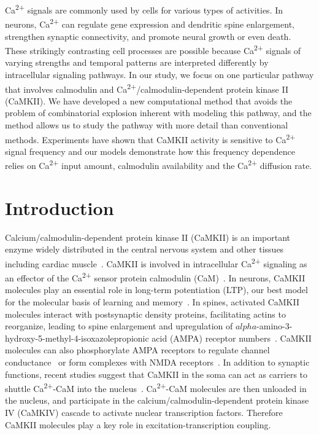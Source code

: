 \documentclass[10pt,letterpaper]{article}
\begin{document}
Ca\textsuperscript{2+} signals are commonly used by cells for various types of activities. In neurons, Ca\textsuperscript{2+} can regulate gene expression and dendritic spine enlargement, strengthen synaptic connectivity, and promote neural growth or even death. These strikingly contrasting cell processes are possible because Ca\textsuperscript{2+} signals of varying strengths and temporal patterns are interpreted differently by intracellular signaling pathways. In our study, we focus on one particular pathway that involves calmodulin and Ca\textsuperscript{2+}/calmodulin-dependent protein kinase II (CaMKII). We have developed a new computational method that avoids the problem of combinatorial explosion inherent with modeling this pathway, and the method allows us to study the pathway with more detail than conventional methods. Experiments have shown that CaMKII activity is sensitive to Ca\textsuperscript{2+} signal frequency and our models demonstrate how this frequency dependence relies on Ca\textsuperscript{2+} input amount, calmodulin availability and the Ca\textsuperscript{2+} diffusion rate.

\linenumbers
\section*{Introduction}
Calcium/calmodulin-dependent protein kinase II (CaMKII) is an important enzyme widely distributed in the central nervous system and other tissues including cardiac muscle~\cite{Wayman:2008gla,Lisman:2002ki,Erickson:2014fs}. CaMKII is involved in intracellular Ca\textsuperscript{2+} signaling as an effector of the Ca\textsuperscript{2+} sensor protein calmodulin (CaM)~\cite{Herring:2016bh,Hell:2014bd,Coultrap:2012ip}. In neurons, CaMKII molecules play an essential role in long-term potentiation (LTP), our best model for the molecular basis of learning and memory~\cite{Bliss:1973jg}. In spines, activated CaMKII molecules interact with postsynaptic density proteins, facilitating actins to reorganize, leading to spine enlargement and upregulation of $alpha$-amino-3-hydroxy-5-methyl-4-isoxazolepropionic acid (AMPA) receptor numbers~\cite{Herring:2016bh}. CaMKII molecules can also phosphorylate AMPA receptors to regulate channel conductance~\cite{Herring:2016bh,Coultrap:2012ip} or form complexes with NMDA receptors~\cite{Hell:2014bd}. In addition to synaptic functions, recent studies suggest that CaMKII in the soma can act as carriers to shuttle Ca\textsuperscript{2+}-CaM into the nucleus~\cite{Ma:2014dr,Li:2016cq}. Ca\textsuperscript{2+}-CaM molecules are then unloaded in the nucleus, and participate in the calcium/calmodulin-dependent protein kinase IV (CaMKIV) cascade to activate nuclear transcription factors. Therefore CaMKII molecules play a key role in excitation-transcription coupling. 
\end{document}
